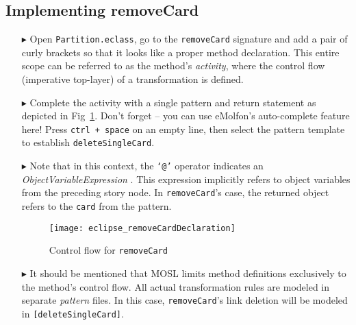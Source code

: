 \newpage
\hypertarget{remCard tex}{}
\subsection{Implementing removeCard}
\texHeader

\begin{itemize}

\item[$\blacktriangleright$] Open \texttt{Partition.eclass}, go to the \texttt{removeCard} signature and add a pair of curly brackets so that it looks like a
proper method declaration. This entire scope can be referred to as the method's \emph{activity}, where the control flow (imperative top-layer) of a
transformation is defined.

\item[$\blacktriangleright$] Complete the activity with a single pattern and return statement as depicted in Fig~\ref{fig:remCardDec}. Don't forget -- you can
use eMolfon's auto-complete feature here! Press \texttt{ctrl + space} on an empty line, then select the pattern template to establish \texttt{deleteSingleCard}.

\item[$\blacktriangleright$] Note that in this context, the \texttt{`@'} operator indicates an \emph{ObjectVariableExpression}%
. This expression implicitly refers to object variables from the preceding story node. In \texttt{removeCard}'s case, the
returned object refers to the \texttt{card} from the pattern.

\vspace{0.5cm}

\begin{figure}[htp]
\begin{center}
  \texttt{[image: eclipse\_removeCardDeclaration]}
  \caption{Control flow for \texttt{removeCard}}
  \label{fig:remCardDec}
\end{center}
\end{figure}

\item[$\blacktriangleright$] It should be mentioned that MOSL limits method definitions exclusively to the method's control flow. All actual transformation
rules are modeled in separate \emph{pattern} files. In this case, \texttt{removeCard}'s link deletion will be modeled in \texttt{[deleteSingleCard]}.

\vspace{0.5cm}


\end{itemize}
